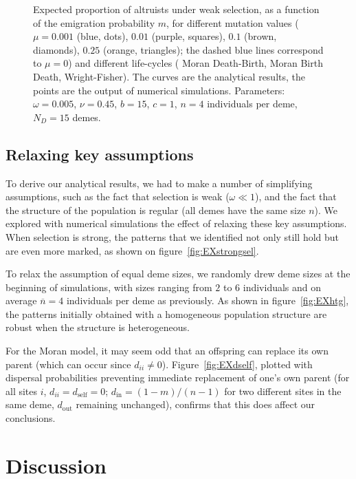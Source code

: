 \documentclass[11pt, letterpaper]{article}
\newcommand{\mutbias}{\nu}
\newcommand{\din}{d_{\textrm{in}}}
\newcommand{\dself}{d_{\textrm{self}}}
\newcommand{\dout}{d_{\textrm{out}}}
\newcommand{\ndemes}{N_D}
\begin{document}
\begin{figure}
\begin{tabular}{ccc}
\end{tabular}
\caption{Expected proportion of altruists under weak selection, as a function of the emigration probability $m$, for different mutation values ($\mu = 0.001$ (blue, dots), $0.01$ (purple, squares), $0.1$ (brown, diamonds), $0.25$ (orange, triangles); the dashed blue lines correspond to $\mu=0$) and different life-cycles ( Moran Death-Birth,  Moran Birth Death,  Wright-Fisher). The curves are the analytical results, the points are the output of numerical simulations. 
Parameters: $\omega = 0.005$, $\mutbias=0.45$, $b = 15$, $c = 1$, $n=4$ individuals per deme, $\ndemes=15$ demes.}
\label{fig:EX}
\end{figure}

\subsection{Relaxing key assumptions}

To derive our analytical results, we had to make a number of simplifying assumptions, such as the fact that selection is weak ($\omega \ll 1$), and the fact that the structure of the population is regular (all demes have the same size $n$). We explored with numerical simulations the effect of relaxing these key assumptions. When selection is strong, the patterns that we identified not only still hold but are even more marked, as shown on  figure~\ref{fig:EXstrongsel}. 

To relax the assumption of equal deme sizes, we randomly drew deme sizes at the beginning of simulations, with sizes ranging from $2$ to $6$ individuals and on average $\overline{n} = 4$ individuals per deme as previously. As shown in figure~\ref{fig:EXhtg}, the patterns initially obtained with a homogeneous population structure are robust when the structure is heterogeneous. 
 
For the Moran model, it may seem odd that an offspring can replace its own parent (which can occur since $d_{ii} \neq 0$). Figure~\ref{fig:EXdself}, plotted with dispersal probabilities preventing immediate replacement of one's own parent (for all sites $i$, $d_{ii}=\dself=0$; $\din = (1-m)/(n-1)$ for two different sites in the same deme, $\dout$ remaining unchanged), confirms that this does affect our conclusions. 

\section{Discussion}
\end{document}
